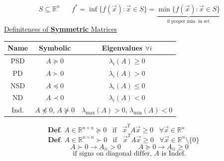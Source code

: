 \documentclass[twocolumn,12pt]{article}    %
\begin{document}
\begin{equation*}
    S \subseteq \mathds{R}^n \hspace{20pt} f^* =  \inf \{ f(\vec{x}) : \vec{x} \in S\} = \underbrace{\min \{ f(\vec{x}) : \vec{x} \in S\}}_{\text{if proper min. in set}}
\end{equation*}
\noindent \underline{Definiteness of \textbf{Symmetric} Matrices}
\begin{table}[H]
    \centering
    \footnotesize
    \begin{tabular}{ccc}
        Name & Symbolic & Eigenvalues \(\forall i\)\\
        \hline
        PSD & \(A\succeq 0\) & \(\lambda_i(A)\geq0\) \\
        PD &  \(A\succ 0\) & \(\lambda_i(A)>0\) \\
        NSD &  \(A\preceq 0\) & \(\lambda_i(A)\leq0\) \\
        ND &  \(A\prec 0\) & \(\lambda_i(A)<0\) \\
        Ind. & \(A \npreceq 0,\, A \nsucceq 0\) & \(\lambda_{\max}(A) > 0, \, \lambda_{\min}(A)<0\)\\
    \end{tabular}
\end{table}
\vspace{-30pt}%
\begin{equation*}
    \textbf{Def. }A\in \mathds{R}^{n\times n} \succeq 0 \hspace{10pt} \text{if} \hspace{10pt} \vec{x}^TA\vec{x} \geq 0 \hspace{10pt} \forall \vec{x} \in \mathds{R}^n \hspace{45pt} 
\end{equation*}
\begin{equation*}
    \textbf{Def. }A\in \mathds{R}^{n\times n} \succ 0 \hspace{10pt} \text{if} \hspace{10pt} \vec{x}^TA\vec{x} \geq 0 \hspace{10pt} \forall \vec{x} \in \mathds{R}^n \setminus \{0\} \hspace{20pt}
\end{equation*}
\begin{equation*}
    A \succ 0 \rightarrow A_{ii} > 0 \hspace{30pt}  A \succeq 0 \rightarrow A_{ii} \geq 0
\end{equation*}
\begin{equation*}
    \text{if signs on diagonal differ, }A \text{ is Indef.}
\end{equation*}
\end{document}
